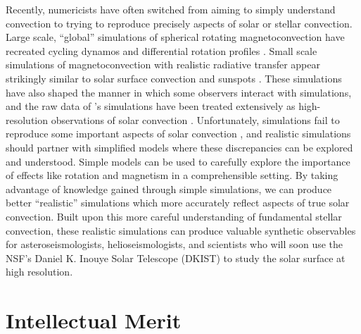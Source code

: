 \documentclass[11pt, preprint]{aastex}
\begin{document}
Recently, numericists have often switched from aiming to simply understand convection to trying to reproduce precisely aspects of solar or stellar convection.
Large scale, ``global'' simulations of spherical rotating magnetoconvection have recreated cycling dynamos and differential rotation profiles \citep{brown&all2010, brown&all2011, guerrero&all2016, hotta&all2016, brun&all2017, strugarek&all2018}.
Small scale simulations of magnetoconvection with realistic radiative transfer appear strikingly similar to solar surface convection and sunspots \citep{stein&nordlund1998, rempel&all2009, stein&nordlund2012, rempel2014}.
These simulations have also shaped the manner in which some observers interact with simulations, and the raw data of \citet{rempel2014}'s simulations have been treated extensively as high-resolution observations of solar convection \citep[see e.g.,][and others]{vankooten&cranmer2017, shchukina&trujillo2019}.
Unfortunately, simulations fail to reproduce some important aspects of solar convection \citep{hanasoge&all2015}, and realistic simulations should partner with simplified models where these discrepancies can be explored and understood.
Simple models can be used to carefully explore the importance of effects like rotation and magnetism in a comprehensible setting.
By taking advantage of knowledge gained through simple simulations, we can produce better ``realistic'' simulations which more accurately reflect aspects of true solar convection.
Built upon this more careful understanding of fundamental stellar convection, these realistic simulations can produce valuable synthetic observables for asteroseismologists, helioseismologists, and scientists who will soon use the NSF's Daniel K. Inouye Solar Telescope (DKIST) to study the solar surface at high resolution.


\section{Intellectual Merit}

\label{sct:intellectual_merit}
\end{document}

